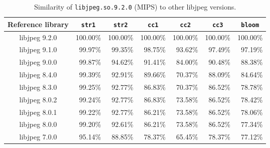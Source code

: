 \documentclass[twocolumn,a4paper]{IEEEtran} %
\begin{document}
\begin{table*}[h]
\begin{adjustbox}{center}
\centering
\small
\begin{tabular}{@{}c|rrrrrr@{}}
\toprule
\multicolumn{1}{c|}{Reference library}
              & \multicolumn{1}{c}{\texttt{str1}}
              & \multicolumn{1}{c}{\texttt{str2}}
              & \multicolumn{1}{c}{\texttt{cc1}}
              & \multicolumn{1}{c}{\texttt{cc2}}
              & \multicolumn{1}{c}{\texttt{cc3}}
              & \multicolumn{1}{c}{\texttt{bloom}}  \\ \midrule
libjpeg 9.2.0 &  100.00\% & 100.00\% & 100.00\% & 100.00\% & 100.00\% & 100.00\% \\
libjpeg 9.1.0 &  99.97\%  & 99.35\%  & 98.75\%  & 93.62\%  & 97.49\%  & 97.19\%  \\
libjpeg 9.0.0 &  99.87\%  & 94.62\%  & 91.41\%  & 84.00\%  & 90.48\%  & 88.38\%  \\
libjpeg 8.4.0 &  99.39\%  & 92.91\%  & 89.66\%  & 70.37\%  & 88.09\%  & 84.64\%  \\
libjpeg 8.3.0 &  99.25\%  & 92.77\%  & 86.83\%  & 70.37\%  & 86.52\%  & 78.78\%  \\
libjpeg 8.0.2 &  99.24\%  & 92.77\%  & 86.83\%  & 73.58\%  & 86.52\%  & 78.42\%  \\
libjpeg 8.0.1 &  99.22\%  & 92.77\%  & 86.21\%  & 73.58\%  & 86.52\%  & 78.06\%  \\
libjpeg 8.0.0 &  99.20\%  & 92.61\%  & 86.21\%  & 73.58\%  & 86.52\%  & 77.34\%  \\
libjpeg 7.0.0 &  95.14\%  & 88.85\%  & 78.37\%  & 65.45\%  & 78.37\%  & 77.12\%  \\
\bottomrule
\end{tabular}
\end{adjustbox}
\caption{Similarity of \texttt{libjpeg.so.9.2.0} (MIPS) to other libjpeg versions.}
\vspace{.5cm}
\label{table:libjpeg-similarities}
\end{table*}
\end{document}
